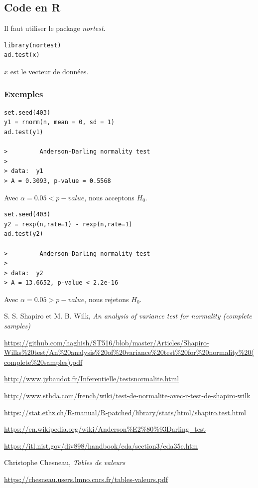 \documentclass[12pt,a4paper]{article}
\begin{document}
\subsection{Code en R}
Il faut utiliser le package \emph{nortest}.

\begin{verbatim}
library(nortest)
ad.test(x)
\end{verbatim}

$x$ est le vecteur de données.

\subsubsection*{Exemples}
\begin{verbatim}
set.seed(403)
y1 = rnorm(n, mean = 0, sd = 1)
ad.test(y1)

>         Anderson-Darling normality test
>
> data:  y1 
> A = 0.3093, p-value = 0.5568
\end{verbatim}
Avec $\alpha = 0.05 < p-value$, nous acceptons $H_0$.

\begin{verbatim}
set.seed(403)
y2 = rexp(n,rate=1) - rexp(n,rate=1)
ad.test(y2)

>         Anderson-Darling normality test
>
> data:  y2 
> A = 13.6652, p-value < 2.2e-16
\end{verbatim}
Avec $\alpha = 0.05 > p-value$, nous rejetons $H_0$.
\begin{thebibliography}{3}

S. S. Shapiro et M. B. Wilk, \emph{An analysis of variance test for normality (complete samples)}

\url{https://github.com/haghish/ST516/blob/master/Articles/Shapiro-Wilks%20test/An%20analysis%20of%20variance%20test%20for%20normality%20(complete%20samples).pdf}

\url{http://www.jybaudot.fr/Inferentielle/testsnormalite.html}

\url{http://www.sthda.com/french/wiki/test-de-normalite-avec-r-test-de-shapiro-wilk}

\url{https://stat.ethz.ch/R-manual/R-patched/library/stats/html/shapiro.test.html}

\url{https://en.wikipedia.org/wiki/Anderson%E2%80%93Darling_test}

\url{https://itl.nist.gov/div898/handbook/eda/section3/eda35e.htm}

Christophe Chesneau, \emph{Tables de valeurs}

\url{https://chesneau.users.lmno.cnrs.fr/tables-valeurs.pdf}
\end{thebibliography}
\end{document}
